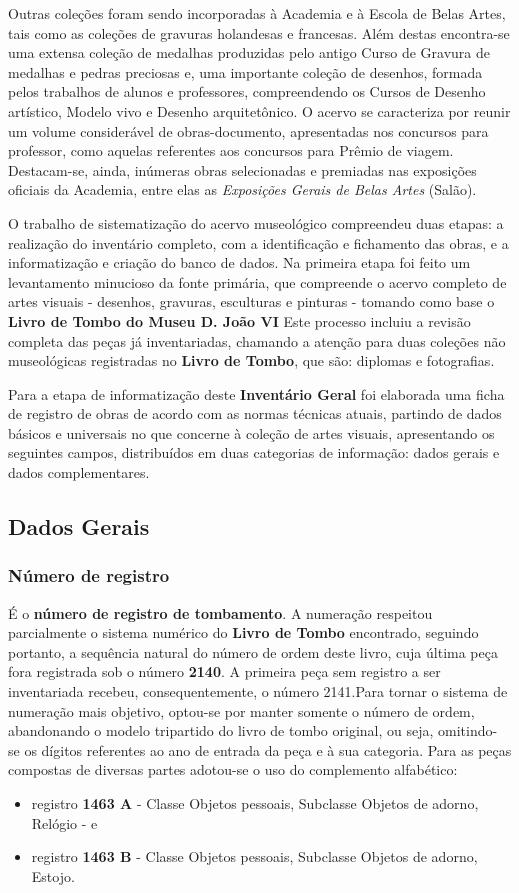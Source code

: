 Outras coleções foram sendo incorporadas à Academia e à Escola de Belas Artes, tais como as coleções de gravuras holandesas e francesas. Além destas encontra-se uma extensa coleção de medalhas produzidas pelo antigo Curso de Gravura de medalhas e pedras preciosas e, uma importante coleção de desenhos, formada pelos trabalhos de alunos e professores, compreendendo os Cursos de Desenho artístico, Modelo vivo e Desenho arquitetônico. O acervo se caracteriza por reunir um volume considerável de obras-documento, apresentadas nos concursos para professor, como aquelas referentes aos concursos para Prêmio de viagem. Destacam-se, ainda, inúmeras obras selecionadas e premiadas nas exposições oficiais da Academia, entre elas as \textit{Exposições Gerais de Belas Artes} (Salão).

O trabalho de sistematização do acervo museológico compreendeu duas etapas: a realização do inventário completo, com a identificação e fichamento das obras, e a informatização e criação do banco de dados.
Na primeira etapa foi feito um levantamento minucioso da fonte primária, que compreende o acervo completo de artes visuais - desenhos, gravuras, esculturas e pinturas - tomando como base o \textbf{Livro de Tombo do Museu D. João VI} Este processo incluiu a revisão completa das peças já inventariadas, chamando a atenção para duas coleções não museológicas registradas no \textbf{Livro de Tombo}, que são: diplomas e fotografias.

Para a etapa de informatização deste \textbf{Inventário Geral} foi elaborada uma ficha de registro de obras de acordo com as normas técnicas atuais, partindo de dados básicos e universais no que concerne à coleção de artes visuais, apresentando os seguintes campos, distribuídos em duas categorias de informação: dados gerais e dados complementares.

\subsection{Dados Gerais}
\subsubsection{Número de registro}
É o \textbf{número de registro de tombamento}. A numeração respeitou parcialmente o sistema numérico do \textbf{Livro de Tombo} encontrado, seguindo portanto, a sequência natural do número de ordem deste livro, cuja última peça fora registrada sob o número \textbf{2140}. A primeira peça sem registro a ser inventariada recebeu, consequentemente, o número 2141.Para tornar o sistema de numeração mais objetivo, optou-se por manter somente o número de ordem, abandonando o modelo tripartido do livro de tombo original, ou seja, omitindo- se os dígitos referentes ao ano de entrada da peça e à sua categoria. Para as peças compostas de diversas partes adotou-se o uso do complemento alfabético: 
\begin{itemize}
	\item registro \textbf{1463 A} - Classe Objetos pessoais, Subclasse Objetos de adorno, Relógio - e 
	\item registro \textbf{1463 B} - Classe Objetos pessoais, Subclasse Objetos de
	adorno, Estojo.
\end{itemize}

